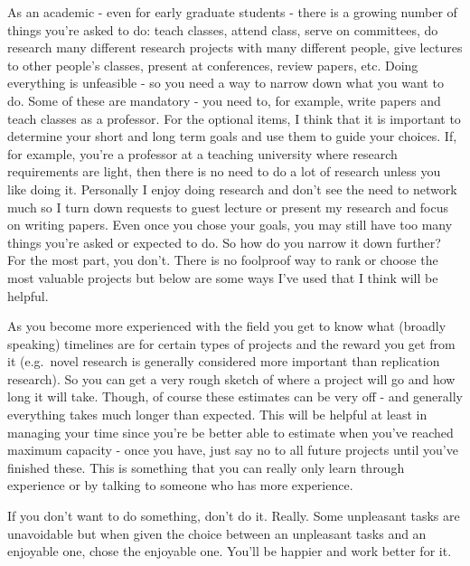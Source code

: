 \documentclass[
  12pt,
]{book}
\begin{document}
As an academic - even for early graduate students - there is a growing number of things you're asked to do: teach classes, attend class, serve on committees, do research many different research projects with many different people, give lectures to other people's classes, present at conferences, review papers, etc. Doing everything is unfeasible - so you need a way to narrow down what you want to do. Some of these are mandatory - you need to, for example, write papers and teach classes as a professor. For the optional items, I think that it is important to determine your short and long term goals and use them to guide your choices. If, for example, you're a professor at a teaching university where research requirements are light, then there is no need to do a lot of research unless you like doing it. Personally I enjoy doing research and don't see the need to network much so I turn down requests to guest lecture or present my research and focus on writing papers. Even once you chose your goals, you may still have too many things you're asked or expected to do. So how do you narrow it down further? For the most part, you don't. There is no foolproof way to rank or choose the most valuable projects but below are some ways I've used that I think will be helpful.

As you become more experienced with the field you get to know what (broadly speaking) timelines are for certain types of projects and the reward you get from it (e.g.~novel research is generally considered more important than replication research). So you can get a very rough sketch of where a project will go and how long it will take. Though, of course these estimates can be very off - and generally everything takes much longer than expected. This will be helpful at least in managing your time since you're be better able to estimate when you've reached maximum capacity - once you have, just say no to all future projects until you've finished these. This is something that you can really only learn through experience or by talking to someone who has more experience.

If you don't want to do something, don't do it. Really. Some unpleasant tasks are unavoidable but when given the choice between an unpleasant tasks and an enjoyable one, chose the enjoyable one. You'll be happier and work better for it.
\end{document}
